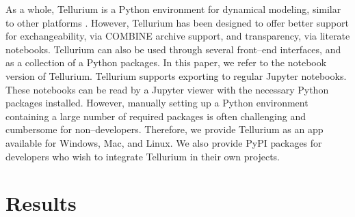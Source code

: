 \documentclass[10pt,letterpaper]{article}
\begin{document}
As a whole, Tellurium is a Python environment for dynamical modeling, similar to other platforms \cite{olivier2005modelling}. However, Tellurium has been designed to offer better support for exchangeability, via COMBINE archive support, and transparency, via literate notebooks. Tellurium can also be used through several front--end interfaces, and as a collection of a Python packages. In this paper, we refer to the notebook version of Tellurium. Tellurium supports exporting to regular Jupyter notebooks. These notebooks can be read by a Jupyter viewer with the necessary Python packages installed. However, manually setting up a Python environment containing a large number of required packages is often challenging and cumbersome for non--developers. Therefore, we provide Tellurium as an app available for Windows, Mac, and Linux. We also provide PyPI packages for developers who wish to integrate Tellurium in their own projects.




\section*{Results}
\end{document}
